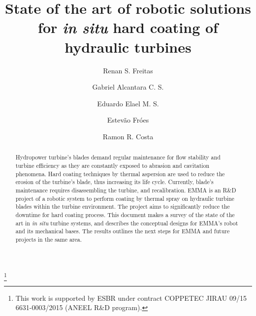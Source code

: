 \documentclass[twocolumn]{svjour3}
\begin{document}

\title{State of the art of robotic solutions for \textit{in situ} hard coating
of hydraulic turbines}%



\author{Renan S. Freitas \and
		Gabriel Alcantara C. S. \and
		Eduardo Elael M. S. \and
		Estevão Fróes \and
		Ramon R. Costa}


\thanks{This work is supported by ESBR under contract COPPETEC
JIRAU 09/15 6631-0003/2015 (ANEEL R\&D program).}

\maketitle
  
\begin{abstract}      
Hydropower turbine's blades demand regular maintenance for flow stability and
turbine efficiency as they are constantly exposed to abrasion and cavitation
phenomena. Hard coating techniques by thermal aspersion are used to reduce the
erosion of the turbine's blade, thus increasing its life cycle. Currently,
blade's maintenance requires disassembling the turbine, and recalibration. EMMA
is an R\&D project of a robotic system to perform coating by thermal spray on
hydraulic turbine blades within the turbine environment. The project aims to
significantly reduce the downtime for hard coating process. This document
makes a survey of the state of the art in \textit{in situ} turbine systems, and
describes the conceptual designs for EMMA's robot and its
mechanical bases. The results outlines the next steps for EMMA and future
projects in the same area. 

\end{abstract} 

 





  
 
\end{document}
